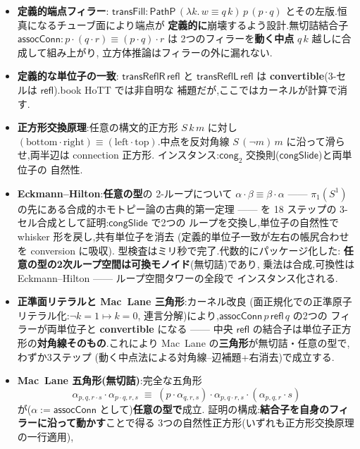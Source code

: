 \documentclass[11pt]{ltjsarticle}
\newcommand{\op}[1]{\ensuremath{\mathsf{#1}}}
\begin{document}
\begin{itemize}[leftmargin=1.5em]
\item \textbf{定義的端点フィラー}:
  $\op{transFill} : \op{PathP}\,(\lambda k.\,w \equiv q\,k)\,p\,
  (p \cdot q)$ とその左版.恒真になるチューブ面により端点が
  \textbf{定義的に}崩壊するよう設計.無切詰結合子
  $\op{assocConn} : p\cdot(q\cdot r) \equiv (p\cdot q)\cdot r$ は
  2つのフィラーを\textbf{動く中点} $q\,k$ 越しに合成して組み上がり,
  立方体推論はフィラーの外に漏れない.
\item \textbf{定義的な単位子の一致}:
  $\op{transReflR}\,\op{refl}$ と $\op{transReflL}\,\op{refl}$ は
  \textbf{convertible}(3-セルは $\op{refl}$).book HoTT では非自明な
  補題だが,ここではカーネルが計算で消す.
\item \textbf{正方形交換原理}:任意の構文的正方形 $S\,k\,m$ に対し
  $(\mathrm{bottom}\cdot\mathrm{right}) \equiv
  (\mathrm{left}\cdot\mathrm{top})$.中点を反対角線
  $S\,(\neg m)\,m$ に沿って滑らせ,両半辺は connection 正方形.
  インスタンス:$\op{cong}_2$ 交換則($\op{congSlide}$)と両単位子の
  自然性.
\item \textbf{Eckmann--Hilton}:\textbf{任意の型}の 2-ループについて
  $\alpha \cdot \beta \equiv \beta \cdot \alpha$ ——
  $\pi_1(S^1)$ の先にある合成的ホモトピー論の古典的第一定理 ——
  を 18 ステップの 3-セル合成として証明:$\op{congSlide}$ で2つの
  ループを交換し,単位子の自然性で whisker 形を戻し,共有単位子を消去
  (定義的単位子一致が左右の帳尻合わせを conversion に吸収).
  型検査はミリ秒で完了.代数的にパッケージ化した:
  \textbf{任意の型の2次ループ空間は可換モノイド}(無切詰)であり,
  乗法は合成,可換性は Eckmann--Hilton —— ループ空間タワーの全段で
  インスタンス化される.
\item \textbf{正準面リテラルと Mac~Lane 三角形}:カーネル改良
  (面正規化での正準原子リテラル化:$\neg k{=}1 \mapsto k{=}0$,
  連言分解)により,$\op{assocConn}\,p\,\op{refl}\,q$ の2つの
  フィラーが両単位子と \textbf{convertible} になる —— 中央 $\op{refl}$
  の結合子は単位子正方形の\textbf{対角線そのもの}.これにより
  Mac~Lane の\textbf{三角形}が無切詰・任意の型で,わずか3ステップ
  (動く中点法による対角線–辺補題+右消去)で成立する.
\item \textbf{Mac~Lane 五角形(無切詰)}:完全な五角形
  \[ \alpha_{p,q,r\cdot s} \cdot \alpha_{p\cdot q,r,s} \;\equiv\;
     (p\cdot\alpha_{q,r,s}) \cdot \alpha_{p,q\cdot r,s} \cdot
     (\alpha_{p,q,r}\cdot s) \]
  が($\alpha := \op{assocConn}$ として)\textbf{任意の型で}成立.
  証明の構成:\textbf{結合子を自身のフィラーに沿って動かす}ことで得る
  3つの自然性正方形(いずれも正方形交換原理の一行適用),

\end{itemize}
\end{document}

